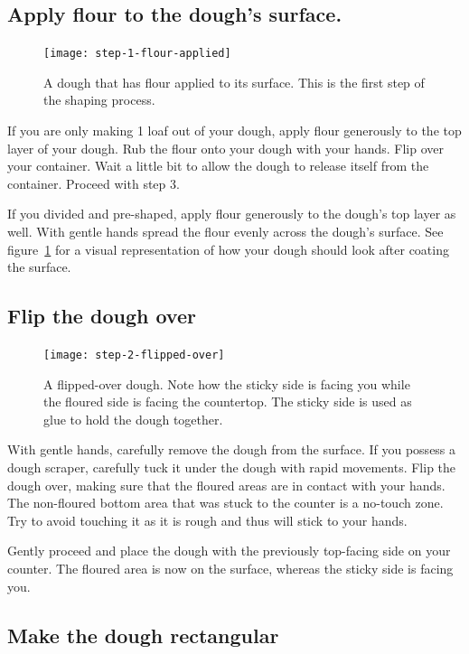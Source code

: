 \subsection[Flouring the surface]{Apply flour to the dough's surface.}

\begin{figure}[!htb]
  \texttt{[image: step-1-flour-applied]}
  \caption{A dough that has flour applied to its surface. This is
  the first step of the shaping process.}%
  \label{fig:shaping-flour-surface}
\end{figure}

If you are only making 1 loaf out of your dough, apply flour
generously to the top layer of your dough. Rub the flour onto your
dough with your hands. Flip over your container. Wait a little bit
to allow the dough to release itself from the container. Proceed
with step 3.

If you divided and pre-shaped, apply flour generously to the dough's
top layer as well. With gentle hands spread the flour evenly across
the dough's surface. See figure~\ref{fig:shaping-flour-surface} for a
visual representation of how your dough should look after coating
the surface.

\subsection[Flipping the dough]{Flip the dough over}

\begin{figure}[!htb]
  \texttt{[image: step-2-flipped-over]}
  \caption{A flipped-over dough. Note how the sticky side is facing
  you while the floured side is facing the countertop. The sticky side
  is used as glue to hold the dough together.}
\end{figure}

With gentle hands, carefully remove the dough from the surface. If
you possess a dough scraper, carefully tuck it under the dough with
rapid movements. Flip the dough over, making sure that the floured
areas are in contact with your hands. The non-floured bottom area that was
stuck to the counter is a no-touch zone. Try to avoid touching it
as it is rough and thus will stick to your hands.

Gently proceed and place the dough with the previously top-facing side
on your counter. The floured area is now on the surface, whereas the
sticky side is facing you.

\subsection[Create rectangular shape]{Make the dough rectangular}

